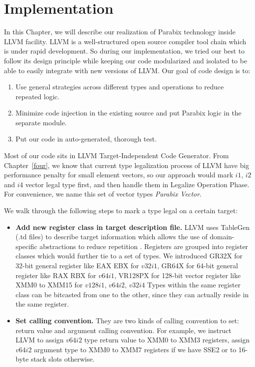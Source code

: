 %
%

\chapter{Implementation}
\label{five}

In this Chapter, we will describe our realization of Parabix technology inside LLVM facility. LLVM is a well-structured open source compiler tool chain which is under rapid development. So during our implementation, we tried our best to follow its design principle while keeping our code modularized and isolated to be able to easily integrate with new versions of LLVM\@. Our goal of code design is to:
\begin{enumerate}
  \item Use general strategies across different types and operations to reduce repeated logic.
  \item Minimize code injection in the existing source and put Parabix logic in the separate module.
  \item Put our code in auto-generated, thorough test.
\end{enumerate}

Most of our code sits in LLVM Target-Independent Code Generator\cite{llvm_code_gen}. From Chapter~\ref{four}, we know that current type legalization process of LLVM have big performance penalty for small element vectors, so our approach would mark $i1$, $i2$ and $i4$ vector legal type first, and then handle them in Legalize Operation Phase. For convenience, we name this set of vector types \textit{Parabix Vector}.

We walk through the following steps to mark a type legal on a certain target:
\begin{itemize}
  \item \textbf{Add new register class in target description file.} LLVM uses TableGen (.td files) to describe target information which allows the use of domain-specific abstractions to reduce repetition \cite{llvm_code_gen}. Registers are grouped into register classes which would further tie to a set of types. We introduced GR32X for 32-bit general register like EAX EBX for $v32i1$, GR64X for 64-bit general register like RAX RBX for $v64i1$, VR128PX for 128-bit vector register like XMM0 to XMM15 for $v128i1$, $v64i2$, $v32i4$  Types within the same register class can be bitcasted from one to the other, since they can actually reside in the same register.

  \item \textbf{Set calling convention.} They are two kinds of calling convention to set: return value and argument calling convention. For example, we instruct LLVM to assign $v64i2$ type return value to XMM0 to XMM3 registers, assign $v64i2$ argument type to XMM0 to XMM7 registers if we have SSE2 or to 16-byte stack slots otherwise.
\end{itemize}

